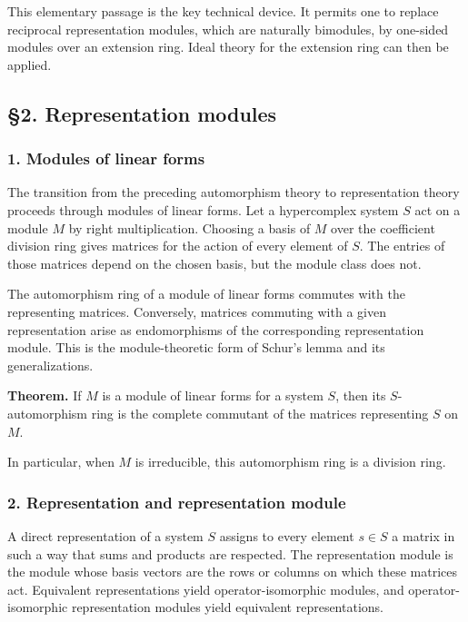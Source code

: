 \documentclass[11pt]{article}
\begin{document}
This elementary passage is the key technical device. It permits one to
replace reciprocal representation modules, which are naturally
bimodules, by one-sided modules over an extension ring. Ideal theory for
the extension ring can then be applied.

\subsection{§2. Representation modules}\label{representation-modules}

\subsubsection{1. Modules of linear
forms}\label{modules-of-linear-forms}

The transition from the preceding automorphism theory to representation
theory proceeds through modules of linear forms. Let a hypercomplex
system \(S\) act on a module \(M\) by right multiplication. Choosing a
basis of \(M\) over the coefficient division ring gives matrices for the
action of every element of \(S\). The entries of those matrices depend
on the chosen basis, but the module class does not.

The automorphism ring of a module of linear forms commutes with the
representing matrices. Conversely, matrices commuting with a given
representation arise as endomorphisms of the corresponding
representation module. This is the module-theoretic form of Schur's
lemma and its generalizations.

\textbf{Theorem.} If \(M\) is a module of linear forms for a system
\(S\), then its \(S\)-automorphism ring is the complete commutant of the
matrices representing \(S\) on \(M\).

In particular, when \(M\) is irreducible, this automorphism ring is a
division ring.

\subsubsection{2. Representation and representation
module}\label{representation-and-representation-module}

A direct representation of a system \(S\) assigns to every element
\(s\in S\) a matrix in such a way that sums and products are respected.
The representation module is the module whose basis vectors are the rows
or columns on which these matrices act. Equivalent representations yield
operator-isomorphic modules, and operator-isomorphic representation
modules yield equivalent representations.
\end{document}
